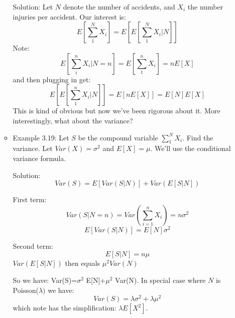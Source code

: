 \documentclass[12pt]{report}
\begin{document}
\begin{itemize}
\begin{itemize}
Solution:
Let $N$ denote the number of accidents, and $X_i$ the number injuries per
accident.  Our interest is: $$E[\sum_1^N X_i]=E[E[\sum_1^N X_i|N]]$$
Note: $$E[\sum_i^n X_i|N=n]=E[\sum_1^n X_i] = nE[X]$$ and then plugging in
get: $$E[E[\sum_1^n X_i|N]]=E[nE[X]]=E[N]E[X]$$
This is kind of obvious but now we've been rigorous about it.  More
interestingly, what about the variance?


\item Example 3.19: Let $S$ be the compound variable $\sum_1^N X_i$.  Find the variance.  Let $Var(X)=\sigma^2$ and $E[X]=\mu$.  We'll use the conditional variance formula.
\label{sec-1-1-7-3-1-2}

Solution:
$$Var(S)=E[Var(S|N)]+Var(E[S|N])$$

First term: 
$$Var(S|N=n)=Var(\sum_{i=1}^n X_i)=n\sigma^2$$
$$E[Var(S|N)]=E[N]\sigma^2$$

Second term:
$$E[S|N]=n\mu$$
$Var(E[S|N])$ then equals $\mu^2 Var(N)$

So we have: Var(S)=$\sigma$$^{\text{2}}$ E[N]+$\mu$$^{\text{2}}$ Var(N).
In special case where $N$ is Poisson($\lambda)$ we
have:$$Var(S)=\lambda\sigma^2+\lambda \mu^2$$ which note has the
simplification: $\lambda E[X^2]$.

\end{itemize}
\end{itemize}
\end{document}
